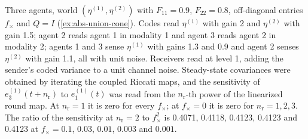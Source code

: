 \begin{numcheck}\label{chk:abs-union-cone}
Three agents, world $(\eta^{(1)},\eta^{(2)})$ with $F_{11}=0.9$, $F_{22}=0.8$, off-diagonal entries $f_\times$ and $Q=I$ (\cref{ex:abs-union-cone}). Codes read $\eta^{(1)}$ with gain 2 and $\eta^{(2)}$ with gain 1.5; agent 2 reads agent 1 in modality 1 and agent 3 reads agent 2 in modality 2; agents 1 and 3 sense $\eta^{(1)}$ with gains 1.3 and 0.9 and agent 2 senses $\eta^{(2)}$ with gain 1.1, all with unit noise. Receivers read at level 1, adding the sender's coded variance to a unit channel noise. Steady-state covariances were obtained by iterating the coupled Riccati maps, and the sensitivity of $e^{(1)}_3(t+n_{\mathrm r})$ to $e^{(1)}_1(t)$ was read from the $n_{\mathrm r}$-th power of the linearized round map. At $n_{\mathrm r}=1$ it is zero for every $f_\times$; at $f_\times=0$ it is zero for $n_{\mathrm r}=1,2,3$. The ratio of the sensitivity at $n_{\mathrm r}=2$ to $f_\times^2$ is 0.4071, 0.4118, 0.4123, 0.4123 and 0.4123 at $f_\times=0.1$, $0.03$, $0.01$, $0.003$ and $0.001$.
\end{numcheck}


